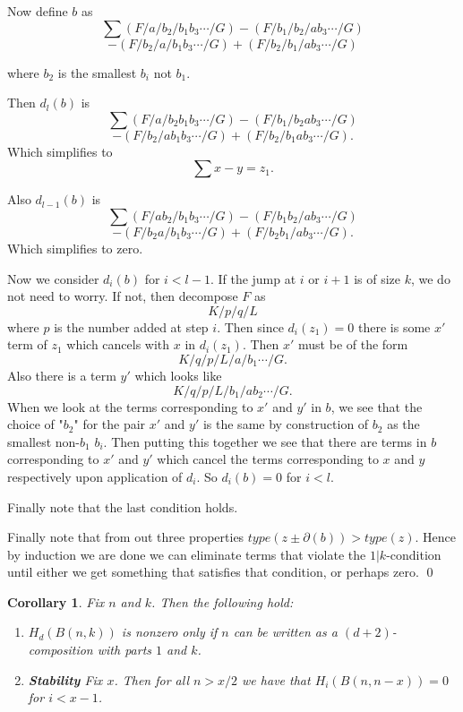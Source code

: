 \documentclass{elsart}
\newtheorem{corollary}[theorem]{Corollary}
\begin{document}
\begin{pf}
\begin{enumerate}
        Now define $b$ as
        $$ \sum (F/a/b_2/b_1b_3 \cdots/G) - (F/b_1/b_2/ab_3 \cdots/G)$$  
        $$- (F/b_2/a/b_1b_3 \cdots/G) + (F/b_2/b_1/ab_3 \cdots /G)$$
       
        where $b_2$ is the smallest $b_i$ not $b_1$.

        Then $d_l(b)$ is $$\sum (F/a/b_2b_1b_3 \cdots/G) - (F/b_1/b_2ab_3 \cdots/G)$$  $$- (F/b_2/ab_1b_3 \cdots/G) + 
        (F/b_2/b_1ab_3 \cdots /G).$$ Which simplifies to $$ \sum x-y = z_1.$$

        Also $d_{l-1}(b)$ is $$\sum (F/ab_2/b_1b_3 \cdots/G) - (F/b_1b_2/ab_3 \cdots/G)$$ $$- (F/b_2a/b_1b_3 \cdots/G) + 
        (F/b_2b_1/ab_3 \cdots /G).$$ Which simplifies to zero.


        Now we consider $d_i(b)$ for $i < l-1$. If the jump at $i$ or $i+1$ is of size $k$, we do not need to worry. 
        If not, then decompose $F$ as $$K/p/q/L$$ where $p$ is the number added at step $i$. Then since $d_i(z_1)=0$ there is some $x'$ term
        of $z_1$ which cancels with $x$ in $d_i(z_1)$. Then $x'$ must be of the form $$ K/q/p/L/a/b_1 \cdots/G.$$ Also there is a term $y'$
        which looks like $$K/q/p/L/b_1/ab_2 \cdots/G.$$ When we look at the terms corresponding to $x'$ and $y'$ in $b$, we see that the 
        choice of "$b_2$" for the pair $x'$ and $y'$ is the same by construction of $b_2$ as the smallest non-$b_1$ $b_i$. Then putting this
        together we see that there are terms in $b$ corresponding to $x'$ and $y'$ which cancel the terms corresponding to $x$ and $y$ 
        respectively upon application of $d_i$. So $d_i(b) = 0$ for $i < l$.

        Finally note that the last condition holds.
    \end{enumerate}

    Finally note that from out three properties  $type(z \pm \partial(b)) > type(z)$. Hence by induction we are done we can eliminate terms
    that violate the $1|k$-condition until either we get something that satisfies that condition, or perhaps zero.
\qed
  \end{pf}

  \begin{corollary} Fix $n$ and $k$. Then the following hold:

   \begin{enumerate}
    \item $H_d(B(n, k))$ is nonzero only if $n$ can be written as a $(d+2)$-composition with parts $1$ and $k$.
    \item {\bf Stability} Fix $x$. Then for all $n > x/2$ we have that $H_i(B(n, n-x)) = 0$ for $i < x - 1$. 
   \end{enumerate}
  \end{corollary}
\end{document}
